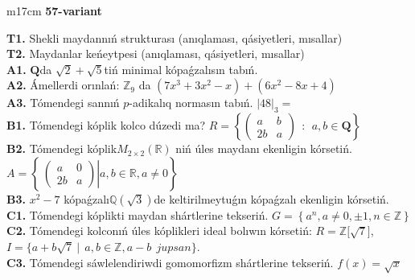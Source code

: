 \documentclass{article}
\begin{document}
\begin{tabular}{m{17cm}}
\textbf{57-variant}
\newline

\textbf{T1.} Shekli maydannıń strukturası (anıqlaması, qásiyetleri, mısallar) \\
\textbf{T2.} Maydanlar keńeytpesi (anıqlaması, qásiyetleri, mısallar) \\
\textbf{A1.} \(\mathbf{Q}\)da \(\sqrt{2} + \sqrt{5}\)tiń minimal kópaǵzalısın tabıń. \\
\textbf{A2.} Ámellerdi orınlań: \(\mathbb{Z}_{9}\) da \(\left( 7x^{3} + 3x^{2} - x \right) + \left( 6x^{2} - 8x + 4 \right)\) \\
\textbf{A3.} Tómendegi sannıń \(p\)-adikalıq normasın tabıń. \(|48|_{3} =\) \\
\textbf{B1.} Tómendegi kóplik kolco dúzedi ma? \(R = \left\{ \begin{pmatrix}
a & b \\
2b & a
\end{pmatrix}\ \ :\ \ a,b \in \mathbf{Q} \right\}\) \\
\textbf{B2.} Tómendegi kóplik\(M_{2 \times 2}\left( \mathbb{R} \right)\) niń úles maydanı ekenligin kórsetiń. \(A = \left\{ \left. \ \begin{pmatrix}
a & 0 \\
2b & a
\end{pmatrix} \right|a,b\mathbb{\in R},a \neq 0 \right\}\) \\
\textbf{B3.} \(x^{2} - 7\) kópaǵzalı\(\mathbb{Q}(\sqrt{3})\)de keltirilmeytuǵın kópaǵzalı ekenligin kórsetiń. \\
\textbf{C1.} Tómendegi kóplikti maydan shártlerine tekseriń. \(G = \left\{ a^{n},a \neq 0, \pm 1,n \in \mathbb{Z} \right\}\) \\
\textbf{C2.} Tómendegi kolconıń úles kóplikleri ideal bolıwın kórsetiń:
\(R\mathbb{= Z\lbrack}\sqrt{7}\rbrack\), \(I = \{ a + b\sqrt{7}\ |\ \ a,b \in \mathbb{Z,}a - b\ \ jupsan\}\). \\
\textbf{C3.} Tómendegi sáwlelendiriwdi gomomorfizm shártlerine tekseriń. \(f(x) = \sqrt{x}\) \\

\end{tabular}
\vspace{1cm}
\end{document}

